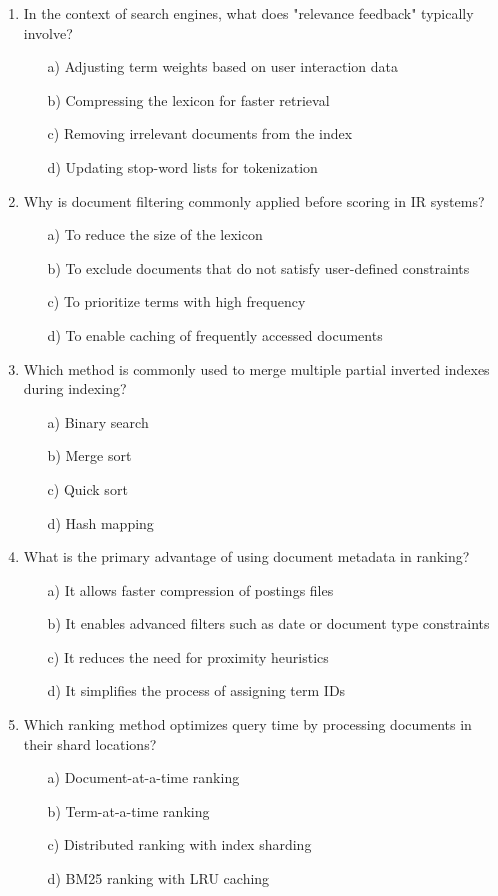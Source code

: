 \documentclass[8pt]{extarticle}
\begin{document}
\begin{multicols}{2}
\begin{enumerate}
\item In the context of search engines, what does "relevance feedback" typically involve?
\begin{itemize}
\item[a)] Adjusting term weights based on user interaction data
\item[b)] Compressing the lexicon for faster retrieval
\item[c)] Removing irrelevant documents from the index
\item[d)] Updating stop-word lists for tokenization
\end{itemize}

\item Why is document filtering commonly applied before scoring in IR systems?
\begin{itemize}
\item[a)] To reduce the size of the lexicon
\item[b)] To exclude documents that do not satisfy user-defined constraints
\item[c)] To prioritize terms with high frequency
\item[d)] To enable caching of frequently accessed documents
\end{itemize}

\item Which method is commonly used to merge multiple partial inverted indexes during indexing?
\begin{itemize}
\item[a)] Binary search
\item[b)] Merge sort
\item[c)] Quick sort
\item[d)] Hash mapping
\end{itemize}

\item What is the primary advantage of using document metadata in ranking?
\begin{itemize}
\item[a)] It allows faster compression of postings files
\item[b)] It enables advanced filters such as date or document type constraints
\item[c)] It reduces the need for proximity heuristics
\item[d)] It simplifies the process of assigning term IDs
\end{itemize}

\item Which ranking method optimizes query time by processing documents in their shard locations?
\begin{itemize}
\item[a)] Document-at-a-time ranking
\item[b)] Term-at-a-time ranking
\item[c)] Distributed ranking with index sharding
\item[d)] BM25 ranking with LRU caching
\end{itemize}


\end{enumerate}
\end{multicols}
\end{document}
